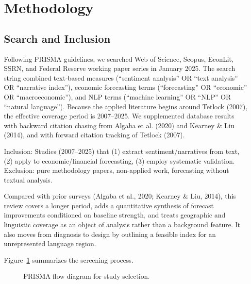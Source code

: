 \documentclass[12pt,oneside]{article}
\begin{document}
\section{Methodology}

\subsection{Search and Inclusion}

Following PRISMA guidelines, we searched Web of Science, Scopus, EconLit, SSRN, and Federal Reserve working paper series in January 2025. The search string combined text-based measures (``sentiment analysis'' OR ``text analysis'' OR ``narrative index''), economic forecasting terms (``forecasting'' OR ``economic'' OR ``macroeconomic''), and NLP terms (``machine learning'' OR ``NLP'' OR ``natural language''). Because the applied literature begins around Tetlock (2007), the effective coverage period is 2007--2025. We supplemented database results with backward citation chasing from Algaba et al. (2020) and Kearney \& Liu (2014), and with forward citation tracking of Tetlock (2007).

Inclusion: Studies (2007--2025) that (1) extract sentiment/narratives from text, (2) apply to economic/financial forecasting, (3) employ systematic validation. Exclusion: pure methodology papers, non-applied work, forecasting without textual analysis.

Compared with prior surveys (Algaba et al., 2020; Kearney \& Liu, 2014), this review covers a longer period, adds a quantitative synthesis of forecast improvements conditioned on baseline strength, and treats geographic and linguistic coverage as an object of analysis rather than a background feature. It also moves from diagnosis to design by outlining a feasible index for an unrepresented language region.

Figure~\ref{fig:prisma} summarizes the screening process.

\begin{figure}[htbp]
\centering
\caption{PRISMA flow diagram for study selection.}
\label{fig:prisma}
\small
{}
\end{figure}
\end{document}
